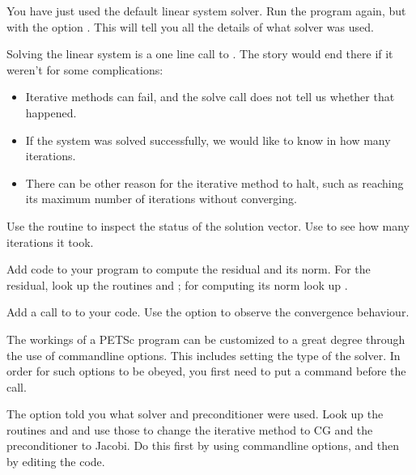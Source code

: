 You have just used the default linear system solver. Run the program
again, but with the option . This will tell you all the
details of what solver was used.

Solving the linear system is a one line call to . The
story would end there if it weren't for some complications:
\begin{itemize}
\item Iterative methods can fail, and the solve call does not tell us
  whether that happened.
\item If the system was solved successfully, we would like to know in
  how many iterations.
\item There can be other reason for the iterative method to halt, such
  as reaching its maximum number of iterations without converging.
\end{itemize}

\begin{exercise}
  Use the
  routine  to inspect the status of the
  solution vector. Use  to see how many
  iterations it took.
\end{exercise}

\begin{exercise}
  Add code to your program to compute the residual and its norm. For
  the residual, look up the routines  and ;
  for computing its norm look up .
\end{exercise}

\begin{exercise}
  Add a call to  to your code. Use the option
   to observe the convergence behaviour.
\end{exercise}

The workings of a PETSc program can be customized to a great degree
through the use of commandline options. This includes setting the type
of the solver. In order for such options to be obeyed, you first need
to put a command  before the  call.

\begin{exercise}
  The  option told you what solver and preconditioner
  were used. Look up the routines  and  and
  use those to change the iterative method to CG and the
  preconditioner to Jacobi. Do this first by using commandline
  options, and then by editing the code.
\end{exercise}

